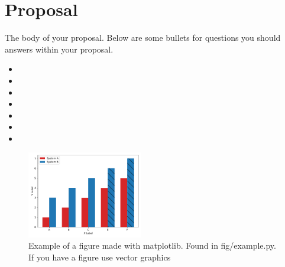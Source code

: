\section{Proposal}

The body of your proposal. Below are some bullets for questions you should
answers within your proposal.

\begin{itemize}
    \item{}
    \item{}
    \item{}
    \item{}
    \item{}
    \item{}
    \item{}
\end{itemize}

\begin{figure}[H]
    \includegraphics[width=0.45\textwidth]{fig/example.pdf}
    \caption{Example of a figure made with matplotlib. Found in fig/example.py. If you have a figure use vector graphics}
    \label{fig:example}
\end{figure}